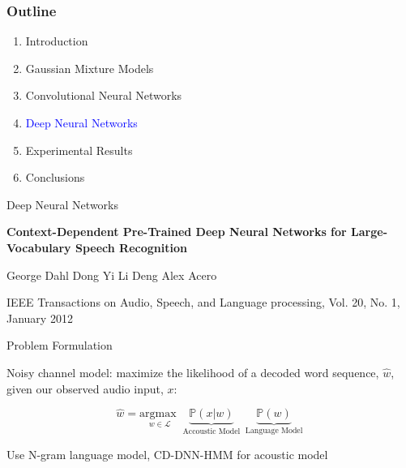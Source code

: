 \documentclass[notes]{beamer}
\newcommand{\argmax}[1]{\underset{#1}{\text{argmax }}}
\newcommand{\cprob}[2]{ \prob{#1 \lvert #2} }
\newcommand{\prob}[1]{\mathbb{P}\left( #1 \right)}
\begin{document}
\begin{frame}
	\frametitle{Outline}
	
	\begin{enumerate}
		\item Introduction
		\item Gaussian Mixture Models
		\item Convolutional Neural Networks
		\item \textcolor{blue}{Deep Neural Networks}
		\item Experimental Results
		\item Conclusions
	\end{enumerate}
\end{frame}

\begin{frame}{Deep Neural Networks}
	\begin{center}
	\textbf{Context-Dependent Pre-Trained Deep Neural Networks for Large-Vocabulary Speech Recognition}
	\end{center}
	
	\vfill

	\hfill George Dahl \hfill Dong Yi \hfill Li Deng \hfill Alex Acero \hfill
	
	\vfill
	
	\begin{center}
		IEEE Transactions on Audio, Speech, and Language processing, Vol. 20, No. 1, January 2012
	\end{center}
	
\end{frame}
	
\begin{frame}{Problem Formulation}
	\begin{center}
		Noisy channel model: maximize the likelihood of a decoded word sequence, $\hat{w}$, given our observed audio input, $x$:
	\end{center}
	 
	\vfill
	
	\begin{equation*}
		\hat{w} = \argmax{w \in \mathscr{L}} \underbrace{\cprob{x}{w}}_{\text{ Accoustic Model }} \underbrace{\prob{w}}_{\text{ Language Model }} 
	\end{equation*}
	
	\vfill
	
	\begin{center}
		Use N-gram language model, CD-DNN-HMM for acoustic model
	\end{center}
\end{frame}
\end{document}
